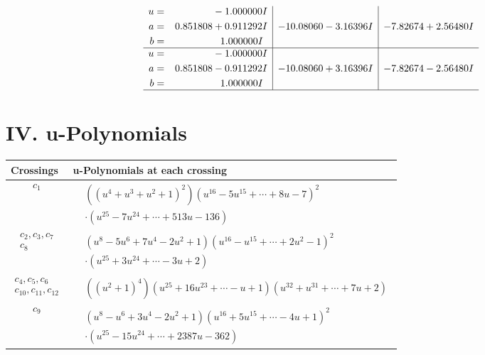 \documentclass[1p]{elsarticle_modified}
\theoremstyle{definition}
\begin{document}
$$\begin{array}{c|c|c}
\begin{aligned}
u &= \phantom{-0.000000 } -1.000000 I \\
a &= \phantom{-}0.851808 + 0.911292 I \\
b &= \phantom{-0.000000 -}1.000000 I\end{aligned}
 & -10.08060 - 3.16396 I & -7.82674 + 2.56480 I \\ \hline\begin{aligned}
u &= \phantom{-0.000000 } -1.000000 I \\
a &= \phantom{-}0.851808 - 0.911292 I \\
b &= \phantom{-0.000000 -}1.000000 I\end{aligned}
 & -10.08060 + 3.16396 I & -7.82674 - 2.56480 I\\
 \hline 
 \end{array}$$\newpage
\newpage\renewcommand{\arraystretch}{1}
\centering \section*{ IV. u-Polynomials}
\begin{tabular}{m{50pt}|m{274pt}}
Crossings & \hspace{64pt}u-Polynomials at each crossing \\
\hline $$\begin{aligned}c_{1}\end{aligned}$$&$\begin{aligned}
&((u^4+u^3+u^2+1)^2)(u^{16}-5 u^{15}+\cdots+8 u-7)^{2}\\
&\cdot(u^{25}-7 u^{24}+\cdots+513 u-136)
\end{aligned}$\\
\hline $$\begin{aligned}c_{2},c_{3},c_{7}\\c_{8}\end{aligned}$$&$\begin{aligned}
&(u^8-5 u^6+7 u^4-2 u^2+1)(u^{16}- u^{15}+\cdots+2 u^2-1)^{2}\\
&\cdot(u^{25}+3 u^{24}+\cdots-3 u+2)
\end{aligned}$\\
\hline $$\begin{aligned}c_{4},c_{5},c_{6}\\c_{10},c_{11},c_{12}\end{aligned}$$&$\begin{aligned}
&((u^2+1)^4)(u^{25}+16 u^{23}+\cdots- u+1)(u^{32}+u^{31}+\cdots+7 u+2)
\end{aligned}$\\
\hline $$\begin{aligned}c_{9}\end{aligned}$$&$\begin{aligned}
&(u^8- u^6+3 u^4-2 u^2+1)(u^{16}+5 u^{15}+\cdots-4 u+1)^{2}\\
&\cdot(u^{25}-15 u^{24}+\cdots+2387 u-362)
\end{aligned}$\\
\hline
\end{tabular}\newpage\renewcommand{\arraystretch}{1}
\end{document}
